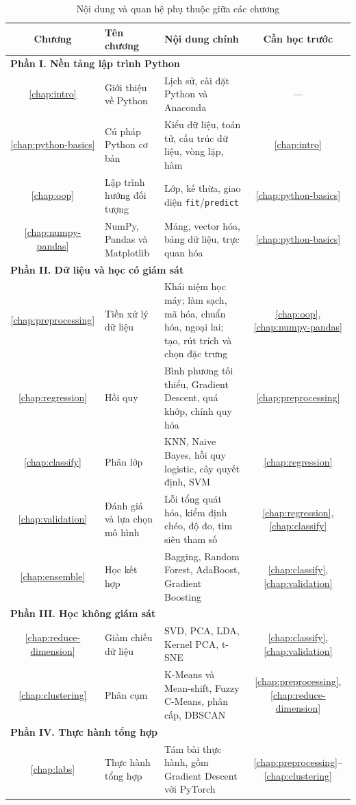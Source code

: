 \begin{table}[tbp]
\centering
\small
\begin{tabular}{|c|>{\raggedright\arraybackslash}p{4.3cm}|>{\raggedright\arraybackslash}p{6.2cm}|c|}
\hline
\textbf{Chương} & \textbf{Tên chương} & \textbf{Nội dung chính} & \textbf{Cần học trước} \\
\hline
\multicolumn{4}{|l|}{\textbf{Phần I. Nền tảng lập trình Python}} \\ \hline
\ref{chap:intro} & Giới thiệu về Python & Lịch sử, cài đặt Python và Anaconda & --- \\ \hline
\ref{chap:python-basics} & Cú pháp Python cơ bản & Kiểu dữ liệu, toán tử, cấu trúc dữ liệu, vòng lặp, hàm & \ref{chap:intro} \\ \hline
\ref{chap:oop} & Lập trình hướng đối tượng & Lớp, kế thừa, giao diện \texttt{fit}/\texttt{predict} & \ref{chap:python-basics} \\ \hline
\ref{chap:numpy-pandas} & NumPy, Pandas và Matplotlib & Mảng, vector hóa, bảng dữ liệu, trực quan hóa & \ref{chap:python-basics} \\ \hline
\multicolumn{4}{|l|}{\textbf{Phần II. Dữ liệu và học có giám sát}} \\ \hline
\ref{chap:preprocessing} & Tiền xử lý dữ liệu & Khái niệm học máy; làm sạch, mã hóa, chuẩn hóa, ngoại lai; tạo, rút trích và chọn đặc trưng & \ref{chap:oop}, \ref{chap:numpy-pandas} \\ \hline
\ref{chap:regression} & Hồi quy & Bình phương tối thiểu, Gradient Descent, quá khớp, chính quy hóa & \ref{chap:preprocessing} \\ \hline
\ref{chap:classify} & Phân lớp & KNN, Naive Bayes, hồi quy logistic, cây quyết định, SVM & \ref{chap:regression} \\ \hline
\ref{chap:validation} & Đánh giá và lựa chọn mô hình & Lỗi tổng quát hóa, kiểm định chéo, độ đo, tìm siêu tham số & \ref{chap:regression}, \ref{chap:classify} \\ \hline
\ref{chap:ensemble} & Học kết hợp & Bagging, Random Forest, AdaBoost, Gradient Boosting & \ref{chap:classify}, \ref{chap:validation} \\ \hline
\multicolumn{4}{|l|}{\textbf{Phần III. Học không giám sát}} \\ \hline
\ref{chap:reduce-dimension} & Giảm chiều dữ liệu & SVD, PCA, LDA, Kernel PCA, t-SNE & \ref{chap:classify}, \ref{chap:validation} \\ \hline
\ref{chap:clustering} & Phân cụm & K-Means và Mean-shift, Fuzzy C-Means, phân cấp, DBSCAN & \ref{chap:preprocessing}, \ref{chap:reduce-dimension} \\ \hline
\multicolumn{4}{|l|}{\textbf{Phần IV. Thực hành tổng hợp}} \\ \hline
\ref{chap:labs} & Thực hành tổng hợp & Tám bài thực hành, gồm Gradient Descent với PyTorch & \ref{chap:preprocessing}--\ref{chap:clustering} \\ \hline
\end{tabular}
\caption{Nội dung và quan hệ phụ thuộc giữa các chương}
\label{tab:preface-roadmap}
\end{table}

